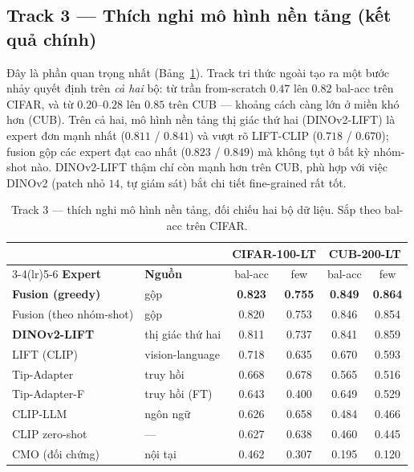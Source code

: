 \subsection{Track 3 --- Thích nghi mô hình nền tảng (kết quả chính)}

Đây là phần quan trọng nhất (Bảng~\ref{tab:foundation}). Track tri thức ngoài tạo ra một bước nhảy
quyết định trên \emph{cả hai} bộ: từ trần from-scratch $0.47$ lên $\mathbf{0.82}$ bal-acc trên
CIFAR, và từ $0.20$--$0.28$ lên $\mathbf{0.85}$ trên CUB --- khoảng cách càng lớn ở miền khó hơn
(CUB). Trên cả hai, mô hình nền tảng thị giác thứ hai (DINOv2-LIFT) là expert đơn mạnh nhất
($0.811$ / $0.841$) và vượt rõ LIFT-CLIP ($0.718$ / $0.670$); fusion gộp các expert đạt cao nhất
($0.823$ / $0.849$) mà không tụt ở bất kỳ nhóm-shot nào. DINOv2-LIFT thậm chí còn mạnh hơn trên CUB,
phù hợp với việc DINOv2 (patch nhỏ $14$, tự giám sát) bắt chi tiết fine-grained rất tốt.

\begin{table}[H]
\centering
\caption{Track 3 --- thích nghi mô hình nền tảng, đối chiếu hai bộ dữ liệu. Sắp theo bal-acc trên CIFAR.}
\label{tab:foundation}
\begin{tabular}{llcccc}
\toprule
 & & \multicolumn{2}{c}{\textbf{CIFAR-100-LT}} & \multicolumn{2}{c}{\textbf{CUB-200-LT}} \\
\cmidrule(lr){3-4}\cmidrule(lr){5-6}
\textbf{Expert} & \textbf{Nguồn} & bal-acc & few & bal-acc & few \\
\midrule
\textbf{Fusion (greedy)} & gộp & \textbf{0.823} & \textbf{0.755} & \textbf{0.849} & \textbf{0.864} \\
Fusion (theo nhóm-shot) & gộp & 0.820 & 0.753 & 0.846 & 0.854 \\
\textbf{DINOv2-LIFT} & thị giác thứ hai & 0.811 & 0.737 & 0.841 & 0.859 \\
LIFT (CLIP) & vision-language & 0.718 & 0.635 & 0.670 & 0.593 \\
Tip-Adapter & truy hồi & 0.668 & 0.678 & 0.565 & 0.516 \\
Tip-Adapter-F & truy hồi (FT) & 0.643 & 0.400 & 0.649 & 0.529 \\
CLIP-LLM & ngôn ngữ & 0.626 & 0.658 & 0.484 & 0.466 \\
CLIP zero-shot & --- & 0.627 & 0.638 & 0.460 & 0.445 \\
CMO (đối chứng) & nội tại & 0.462 & 0.307 & 0.195 & 0.120 \\
\bottomrule
\end{tabular}
\end{table}

